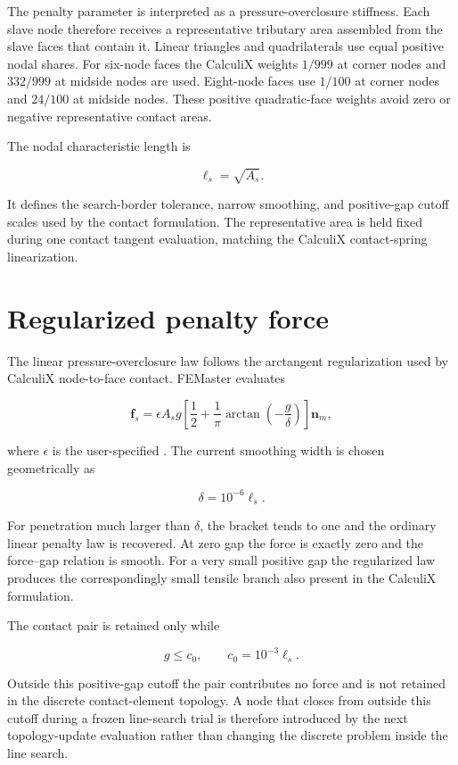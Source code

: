 The penalty parameter is interpreted as a pressure-overclosure stiffness. Each slave node therefore receives a representative tributary area assembled from the slave faces that contain it. Linear triangles and quadrilaterals use equal positive nodal shares. For six-node faces the CalculiX weights \(1/999\) at corner nodes and \(332/999\) at midside nodes are used. Eight-node faces use \(1/100\) at corner nodes and \(24/100\) at midside nodes. These positive quadratic-face weights avoid zero or negative representative contact areas.

The nodal characteristic length is

\[
    \ell_s = \sqrt{A_s}.
\]

It defines the search-border tolerance, narrow smoothing, and positive-gap cutoff scales used by the contact formulation. The representative area is held fixed during one contact tangent evaluation, matching the CalculiX contact-spring linearization.

\section{Regularized penalty force}

The linear pressure-overclosure law follows the arctangent regularization used by CalculiX node-to-face contact. FEMaster evaluates

\[
    \mathbf{f}_s
    = \epsilon A_s g
      \left[
          \frac{1}{2}
          + \frac{1}{\pi}
            \arctan\left(-\frac{g}{\delta}\right)
      \right]
      \mathbf{n}_m,
\]

where \(\epsilon\) is the user-specified . The current smoothing width is chosen geometrically as

\[
    \delta = 10^{-6}\ell_s.
\]

For penetration much larger than \(\delta\), the bracket tends to one and the ordinary linear penalty law is recovered. At zero gap the force is exactly zero and the force--gap relation is smooth. For a very small positive gap the regularized law produces the correspondingly small tensile branch also present in the CalculiX formulation.

The contact pair is retained only while

\[
    g \le c_0,
    \qquad
    c_0 = 10^{-3}\ell_s.
\]

Outside this positive-gap cutoff the pair contributes no force and is not retained in the discrete contact-element topology. A node that closes from outside this cutoff during a frozen line-search trial is therefore introduced by the next topology-update evaluation rather than changing the discrete problem inside the line search.

